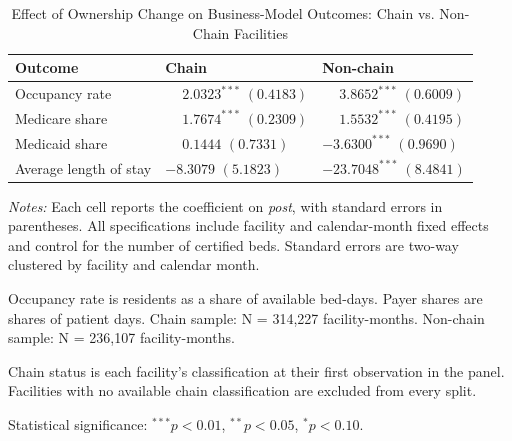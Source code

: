 \documentclass[11pt]{article}
\begin{document}
\begin{table}[!ht]
\begin{threeparttable}
\end{threeparttable}
\end{table}
\clearpage
\begin{table}[!ht]
\centering
\begin{threeparttable}
\caption{Effect of Ownership Change on Business-Model Outcomes: Chain vs. Non-Chain Facilities}
\label{tab:het-chain-business}
\small
\setlength{\tabcolsep}{6pt}

\begin{tabularx}{\textwidth}{@{} l Y Y @{}}
\toprule
Outcome & Chain & Non-chain \\
\midrule
Occupancy rate &  &  \\
Medicare share &  &  \\
Medicaid share &  &  \\
Average length of stay &  &  \\
\bottomrule
\end{tabularx}

\begin{tablenotes}[flushleft]
\footnotesize
\item \textit{Notes:} Each cell reports the coefficient on \textit{post}, with standard errors in parentheses. All specifications include facility and calendar-month fixed effects and control for the number of certified beds. Standard errors are two-way clustered by facility and calendar month.
\item Occupancy rate is residents as a share of available bed-days. Payer shares are shares of patient days. Chain sample: N = 314,227 facility-months. Non-chain sample: N = 236,107 facility-months.
\item Chain status is each facility's classification at their first observation in the panel. Facilities with no available chain classification are excluded from every split.
\item Statistical significance: $^{***}p<0.01$, $^{**}p<0.05$, $^{*}p<0.10$.
\end{tablenotes}

\end{threeparttable}
\end{table}
\end{document}

